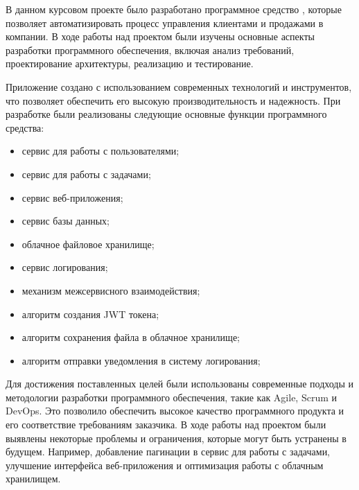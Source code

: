 \label{sec:outro}

В данном курсовом проекте было разработано программное средство \taskNameFull, которые позволяет автоматизировать процесс управления 
клиентами и продажами в компании. В ходе работы над проектом были изучены основные аспекты разработки программного обеспечения, включая 
анализ требований, проектирование архитектуры, реализацию и тестирование.

Приложение создано с использованием современных технологий и инструментов, что позволяет обеспечить его высокую производительность и 
надежность. При разработке были реализованы следующие основные функции программного средства:
\begin{itemize}
    \item сервис для работы с пользователями;
    \item сервис для работы с задачами;
    \item сервис веб-приложения;
    \item сервис базы данных;
    \item облачное файловое хранилище;
    \item сервис логирования;
    \item механизм межсервисного взаимодействия;
    \item алгоритм создания JWT токена;
    \item алгоритм сохранения файла в облачное хранилище;
    \item алгоритм отправки уведомления в систему логирования;
\end{itemize}

Для достижения поставленных целей были использованы современные подходы и методологии разработки программного обеспечения, такие как
Agile, Scrum и DevOps. Это позволило обеспечить высокое качество программного продукта и его соответствие требованиям заказчика.
В ходе работы над проектом были выявлены некоторые проблемы и ограничения, которые могут быть устранены в будущем. Например,
добавление пагинации в сервис для работы с задачами, улучшение интерфейса веб-приложения и оптимизация работы с облачным хранилищем.